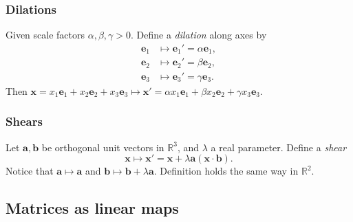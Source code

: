 \documentclass[a4paper]{article}
\begin{document}
\subsubsection{Dilations}
Given scale factors $ \alpha,\beta,\gamma>0 $. Define a
\textit{dilation} along axes by
\[
  \begin{aligned}
    \mathbf{e}_1 &\mapsto \mathbf{e}_1'=\alpha \mathbf{e}_1,\\
    \mathbf{e}_2 &\mapsto \mathbf{e}_2'=\beta \mathbf{e}_2,\\
    \mathbf{e}_3 &\mapsto \mathbf{e}_3'=\gamma \mathbf{e}_3.
  \end{aligned}
\]
Then $ \mathbf{x}=x_1 \mathbf{e}_1+x_2 \mathbf{e}_2 +x_3 \mathbf{e}_3
\mapsto \mathbf{x}'=\alpha x_1 \mathbf{e}_1+\beta x_2 \mathbf{e}_2
+\gamma x_3 \mathbf{e}_3 $.
\subsubsection{Shears}
Let $ \mathbf{a},\mathbf{b} $ be orthogonal unit vectors in $
\mathbb{R}^{3} $, and $ \lambda $ a real parameter. Define a \textit{shear}
\[
  \mathbf{x} \mapsto \mathbf{x}'=\mathbf{x}+\lambda
  \mathbf{a}(\mathbf{x}\cdot \mathbf{b})
.\]
Notice that $ \mathbf{a}\mapsto \mathbf{a} $ and $ \mathbf{b} \mapsto
\mathbf{b}+\lambda \mathbf{a} $. Definition holds the same way in $
\mathbb{R}^{2} $.
\subsection{Matrices as linear maps}
\end{document}
